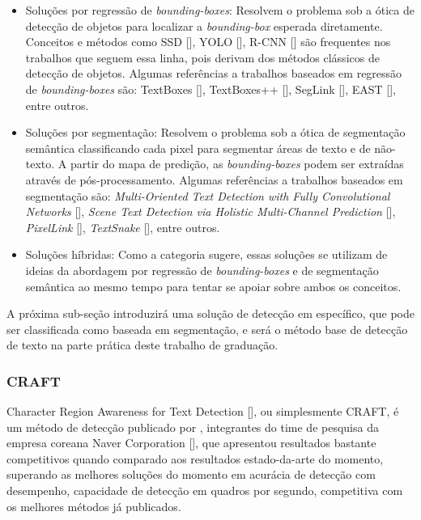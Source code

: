 \begin{itemize}
    \item Soluções por regressão de \textit{bounding-boxes}: Resolvem o problema sob a ótica de detecção de objetos para localizar a \textit{bounding-box} esperada diretamente. Conceitos e métodos como SSD [], YOLO [], R-CNN [] são frequentes nos trabalhos que seguem essa linha, pois derivam dos métodos clássicos de detecção de objetos. Algumas referências a trabalhos baseados em regressão de \textit{bounding-boxes} são: TextBoxes [], TextBoxes++ [], SegLink [], EAST [], entre outros.
    \item Soluções por segmentação: Resolvem o problema sob a ótica de segmentação semântica classificando cada pixel para segmentar áreas de texto e de não-texto. A partir do mapa de predição, as \textit{bounding-boxes} podem ser extraídas através de pós-processamento. Algumas referências a trabalhos baseados em segmentação são: \textit{Multi-Oriented Text Detection with Fully Convolutional Networks} [], \textit{Scene Text Detection via Holistic Multi-Channel Prediction} [], \textit{PixelLink} [], \textit{TextSnake} [], entre outros.
    \item Soluções híbridas: Como a categoria sugere, essas soluções se utilizam de ideias da abordagem por regressão de \textit{bounding-boxes}  e de segmentação semântica ao mesmo tempo para tentar se apoiar sobre ambos os conceitos.
\end{itemize}

A próxima sub-seção introduzirá uma solução de detecção em específico, que pode ser classificada como baseada em segmentação, e será o método base de detecção de texto na parte prática deste trabalho de graduação.


\subsubsection{CRAFT}\label{craft}
Character Region Awareness for Text Detection [], ou simplesmente CRAFT, é um método de detecção publicado por \citeauthor{CRAFT}, integrantes do time de pesquisa da empresa coreana Naver Corporation [], que apresentou resultados bastante competitivos quando comparado aos resultados estado-da-arte do momento, superando as melhores soluções do momento em acurácia de detecção com desempenho, capacidade de detecção em quadros por segundo, competitiva com os melhores métodos já publicados.
	
